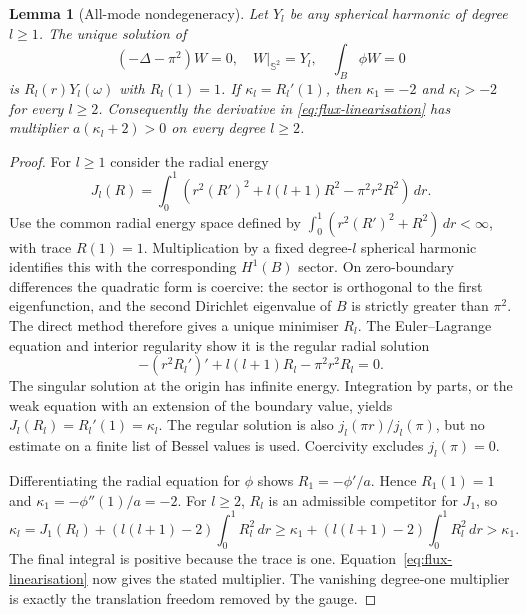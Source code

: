 \documentclass[11pt,a4paper]{article}
\newtheorem{lemma}[theorem]{Lemma}
\theoremstyle{definition}
\theoremstyle{remark}
\begin{document}
\begin{lemma}[All-mode nondegeneracy]\label{lem:modes}
Let $Y_l$ be any spherical harmonic of degree $l\geq1$. The unique solution of
\[
 (-\Delta-\pi^2)W=0,\quad W|_{\mathbb S^2}=Y_l,
 \quad \int_B\phi W=0
\]
is $R_l(r)Y_l(\omega)$ with $R_l(1)=1$. If $\kappa_l=R_l'(1)$, then $\kappa_1=-2$ and $\kappa_l>-2$ for every $l\geq2$. Consequently the derivative in \eqref{eq:flux-linearisation} has multiplier $a(\kappa_l+2)>0$ on every degree $l\geq2$.
\end{lemma}
\begin{proof}
For $l\geq1$ consider the radial energy
\[
 J_l(R)=\int_0^1\left(r^2(R')^2+l(l+1)R^2-\pi^2r^2R^2\right)\,dr.
\]
Use the common radial energy space defined by $\int_0^1(r^2(R')^2+R^2)\,dr<\infty$, with trace $R(1)=1$. Multiplication by a fixed degree-$l$ spherical harmonic identifies this with the corresponding $H^1(B)$ sector. On zero-boundary differences the quadratic form is coercive: the sector is orthogonal to the first eigenfunction, and the second Dirichlet eigenvalue of $B$ is strictly greater than $\pi^2$. The direct method therefore gives a unique minimiser $R_l$. The Euler--Lagrange equation and interior regularity show it is the regular radial solution
\[
 -(r^2R_l')'+l(l+1)R_l-\pi^2r^2R_l=0.
\]
The singular solution at the origin has infinite energy. Integration by parts, or the weak equation with an extension of the boundary value, yields $J_l(R_l)=R_l'(1)=\kappa_l$. The regular solution is also $j_l(\pi r)/j_l(\pi)$, but no estimate on a finite list of Bessel values is used. Coercivity excludes $j_l(\pi)=0$.

Differentiating the radial equation for $\phi$ shows $R_1=-\phi'/a$. Hence $R_1(1)=1$ and $\kappa_1=-\phi''(1)/a=-2$. For $l\geq2$, $R_l$ is an admissible competitor for $J_1$, so
\[
 \kappa_l=J_1(R_l)+(l(l+1)-2)\int_0^1R_l^2\,dr
 \geq\kappa_1+(l(l+1)-2)\int_0^1R_l^2\,dr>\kappa_1.
\]
The final integral is positive because the trace is one. Equation~\eqref{eq:flux-linearisation} now gives the stated multiplier. The vanishing degree-one multiplier is exactly the translation freedom removed by the gauge.
\end{proof}
\end{document}
